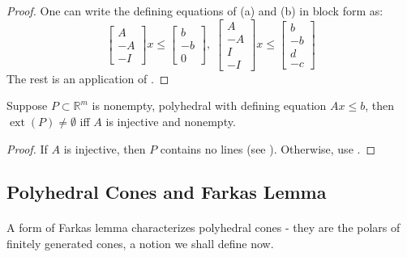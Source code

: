 \begin{proof}
	One can write the defining equations of (a) and (b) in block form as:
	\[
		\left[
			\begin{array}{r}
				A  \\\hline
				-A \\\hline
				-I
			\end{array}
			\right]
		x\leq
		\left[
			\begin{array}{r}
				b  \\\hline
				-b \\\hline
				0
			\end{array}
			\right],\;
		\left[
			\begin{array}{r}
				A  \\\hline
				-A \\\hline
				I  \\\hline
				-I
			\end{array}
			\right]
		x\leq
		\left[
			\begin{array}{r}
				b  \\\hline
				-b \\\hline
				d  \\\hline
				-c
			\end{array}
			\right]
	\]
	The rest is an application of .
\end{proof}

\begin{coro}\label{coro:017-extreme-existence-poly}
	Suppose $P\subset \mathbb{R}^m$ is nonempty, polyhedral with defining equation $Ax\leq b$, then $\operatorname{ext}(P)\neq\emptyset$ iff $A$ is injective and nonempty.
\end{coro}
\begin{proof}
	If $A$ is injective, then $P$ contains no lines (see ). Otherwise, use .
\end{proof}

\subsection{Polyhedral Cones and Farkas Lemma}

\paragraph{}A form of Farkas lemma characterizes polyhedral cones - they are the polars of finitely generated cones, a notion we shall define now.

